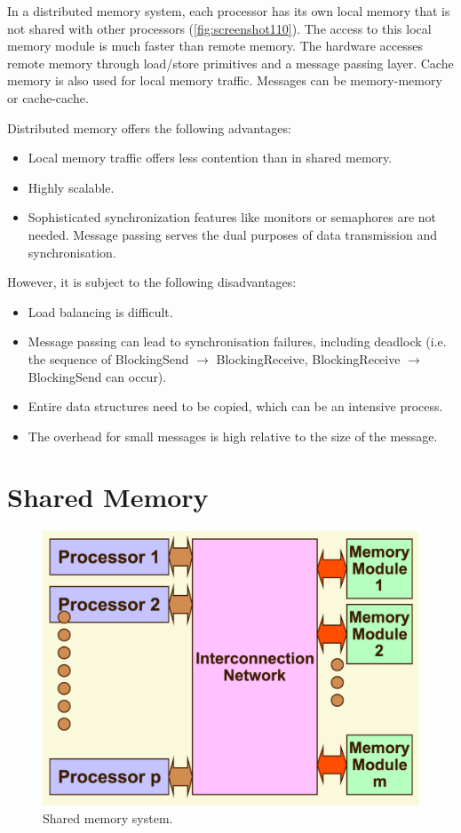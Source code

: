 In a distributed memory system, each processor has its own local memory that is not shared with other processors (\autoref{fig:screenshot110}). The access to this local memory module is much faster than remote memory. The hardware accesses remote memory through load/store primitives and a message passing layer. Cache memory is also used for local memory traffic. Messages can be memory-memory or cache-cache.

Distributed memory offers the following advantages: \begin{itemize}
\item Local memory traffic offers less contention than in shared memory.
\item Highly scalable.
\item Sophisticated synchronization features like monitors or semaphores are not needed. Message passing serves the dual purposes of data transmission and synchronisation.
\end{itemize}

However, it is subject to the following disadvantages: \begin{itemize}
\item Load balancing is difficult.
\item Message passing can lead to synchronisation failures, including deadlock (i.e. the sequence of BlockingSend $\rightarrow$ BlockingReceive, BlockingReceive $\rightarrow$ BlockingSend can occur).
\item Entire data structures need to be copied, which can be an intensive process.
\item The overhead for small messages is high relative to the size of the message.
\end{itemize}

\section{Shared Memory}
\begin{figure}
\centering
\includegraphics[width=0.7\linewidth]{screenshot111}
\caption{Shared memory system.}
\label{fig:screenshot111}
\end{figure}

